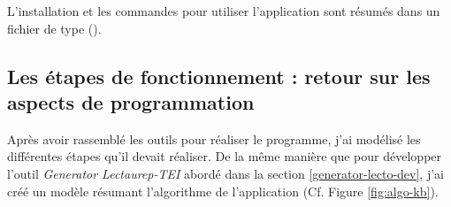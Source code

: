 L'installation et les commandes pour utiliser l'application sont résumés dans un fichier de type  ().

\subsection{Les étapes de fonctionnement : retour sur les aspects de programmation}

Après avoir rassemblé les outils pour réaliser le programme, j'ai modélisé les différentes étapes qu'il devait réaliser. De la même manière que pour développer l'outil \textit{Generator Lectaurep-TEI} abordé dans la section \ref{generator-lecto-dev}, j'ai créé un modèle résumant l'algorithme de l'application (Cf. Figure \ref{fig:algo-kb}).\\

